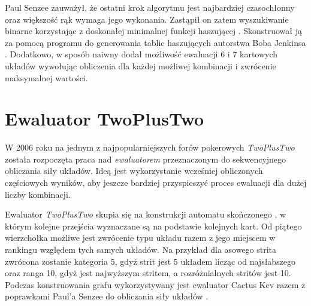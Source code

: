 Paul Senzee \cite{paul-senzee-improvements} zauważył, że ostatni krok algorytmu jest najbardziej czasochłonny oraz większość rąk wymaga jego wykonania. Zastąpił on zatem wyszukiwanie binarne korzystając z doskonałej minimalnej funkcji haszującej \cite{minimal-perfect-hash-function}. Skonstruował ją za pomocą programu do generowania tablic haszujących autorstwa Boba Jenkinsa \cite{bob-jenkins-hashing}. Dodatkowo, w sposób naiwny dodał możliwość ewaluacji 6 i 7 kartowych układów wywołując obliczenia dla każdej możliwej kombinacji i zwrócenie maksymalnej wartości.

\section{Ewaluator TwoPlusTwo}

W 2006 roku na jednym z najpopularniejszych forów pokerowych \emph{TwoPlusTwo} \cite{twoplustwo-thread} \cite{poker-hand-evaluator-roundup} została rozpoczęta praca nad \emph{ewaluatorem} przeznaczonym do sekwencyjnego obliczania siły układów. Ideą jest wykorzystanie wcześniej obliczonych częściowych wyników, aby jeszcze bardziej przyspieszyć proces ewaluacji dla dużej liczby kombinacji. 

Ewaluator \emph{TwoPlusTwo} skupia się na konstrukcji automatu skończonego \cite{finite-state-machine}, w którym kolejne przejścia wyznaczane są na podstawie kolejnych kart. Od piątego wierzchołka możliwe jest zwrócenie typu układu razem z jego miejscem w rankingu względem tych samych układów. Na przykład dla asowego strita zwrócona zostanie kategoria 5, gdyż strit jest 5 układem licząc od najsłabszego oraz ranga 10, gdyż jest najwyższym stritem, a rozróżnialnych stritów jest 10. Podczas konstruowania grafu wykorzystywany jest ewaluator Cactus Kev razem z poprawkami Paul'a Senzee do obliczania siły układów . 


